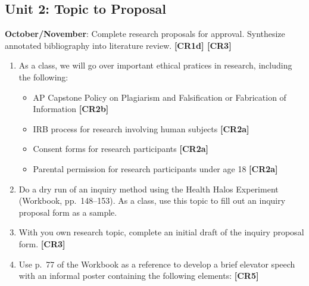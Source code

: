 \documentclass[11pt,]{article}
\providecommand{\tightlist}{%
  \setlength{\itemsep}{0pt}\setlength{\parskip}{0pt}}
\begin{document}
\hypertarget{unit-2-topic-to-proposal}{%
\subsection{Unit 2: Topic to Proposal}\label{unit-2-topic-to-proposal}}

\textbf{October/November}: Complete research proposals for approval. Synthesize annotated bibliography into literature review. \textbf{{[}CR1d{]} {[}CR3{]}}  

\begin{enumerate}
\def\labelenumi{\arabic{enumi}.}
\item
  As a class, we will go over important ethical pratices in research, including the following:

  \begin{itemize}
  \tightlist
  \item
    AP Capstone Policy on Plagiarism and Falsification or Fabrication of Information \textbf{{[}CR2b{]}} 
  \item
    IRB process for research involving human subjects \textbf{{[}CR2a{]}} 
  \item
    Consent forms for research participants \textbf{{[}CR2a{]}} 
  \item
    Parental permission for research participants under age 18 \textbf{{[}CR2a{]}} 
  \end{itemize}
\item
  Do a dry run of an inquiry method using the Health Halos Experiment (Workbook, pp.~148--153). As a class, use this topic to fill out an inquiry proposal form as a sample.
\item
  With you own research topic, complete an initial draft of the inquiry proposal form. \textbf{{[}CR3{]}} 
\item
  Use p.~77 of the Workbook as a reference to develop a brief elevator speech with an informal poster containing the following elements: \textbf{{[}CR5{]}} 


\end{enumerate}
\end{document}

